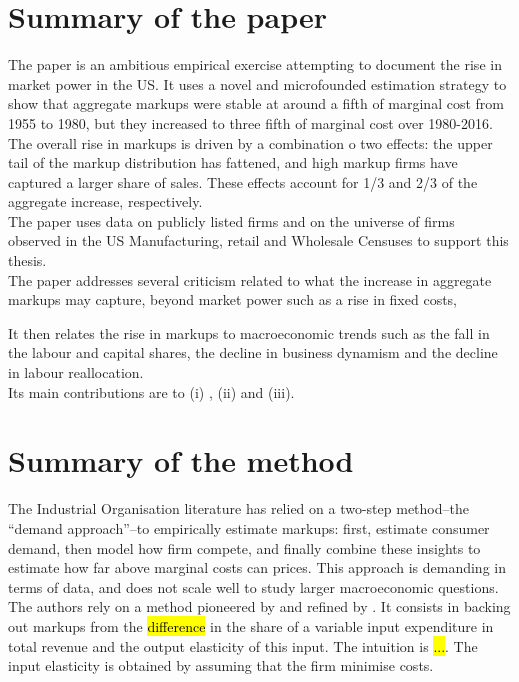\documentclass{amsart}
\theoremstyle{definition}
\theoremstyle{remark}
\numberwithin{equation}{section}
\begin{document}
\section{Summary of the paper}

The paper is an ambitious empirical exercise attempting to document the rise in market power in the US. It uses a novel and microfounded estimation strategy to show that aggregate markups were stable at around a fifth of marginal cost from 1955 to 1980, but they increased to three fifth of marginal cost over 1980-2016. The overall rise in markups is driven by a combination o two effects: the upper tail of the markup distribution has fattened, and high markup firms have captured a larger share of sales. These effects account for 1/3 and 2/3 of the aggregate increase, respectively.\\

The paper uses data on publicly listed firms and on the universe of firms observed in the US Manufacturing, retail and Wholesale Censuses to support this thesis.\\

The paper addresses several criticism related to what the increase in aggregate markups may capture, beyond market power such as a rise in fixed costs, 

It then relates the rise in markups to macroeconomic trends such as the fall in the labour and capital shares, the decline in business dynamism and the decline in labour reallocation.\\

Its main contributions are to (i) , (ii) and (iii).

\section{Summary of the method}

The Industrial Organisation literature has relied on a two-step method--the ``demand approach''--to empirically estimate markups: first, estimate consumer demand, then model how firm compete, and finally combine these insights to estimate how far above marginal costs can prices. This approach is demanding in terms of data, and does not scale well to study larger macroeconomic questions.\\

The authors rely on a method pioneered by \cite{hall1988relation} and refined by \cite{de2012markups}. It consists in backing out markups from the \hl{difference} in the share of a variable input expenditure in total revenue and the output elasticity of this input. The intuition is \hl{...}. The input elasticity is obtained by assuming that the firm minimise costs.\\
\end{document}
